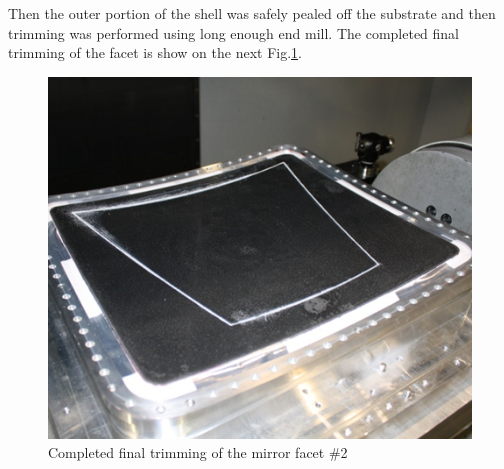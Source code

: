Then the outer portion of the shell was safely pealed off the substrate and then trimming was performed using long enough end mill. The completed final trimming of the facet is show on the next Fig.\ref{fig:Trimming_2}.
\begin{figure}[h]
    \centering
    \includegraphics[width=1.0\linewidth]{Trimming_2}
    \caption{Completed final trimming of the mirror facet \#2}
    \label{fig:Trimming_2}
\end{figure}{}

